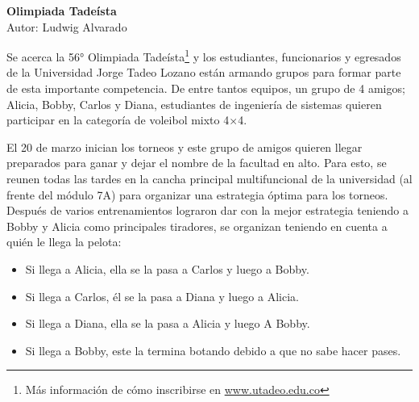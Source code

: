 \documentclass[11pt,a4paper]{article}
\begin{document}
\begin{center}
  {\LARGE \bf Olimpiada Tadeísta}\\[1ex]
  Autor: Ludwig Alvarado
\end{center}


Se acerca la 56° Olimpiada Tadeísta\footnote{Más información de cómo inscribirse en \url{www.utadeo.edu.co}} y los estudiantes, funcionarios y egresados de la Universidad Jorge Tadeo Lozano están armando grupos para formar parte de esta importante competencia. De entre tantos equipos, un grupo de 4 amigos; Alicia, Bobby, Carlos y Diana, estudiantes de ingeniería de sistemas quieren participar en la categoría de voleibol mixto 4\(\times\)4.

El 20 de marzo inician los torneos y este grupo de amigos quieren llegar preparados para ganar y dejar el nombre de la facultad en alto. Para esto, se reunen todas las tardes en la cancha principal multifuncional de la universidad (al frente del módulo 7A) para organizar una estrategia óptima para los torneos. Después de varios entrenamientos lograron dar con la mejor estrategia teniendo a Bobby y Alicia como principales tiradores, se organizan teniendo en cuenta a quién le llega la pelota:

\begin{itemize}
  \item Si llega a Alicia, ella se la pasa a Carlos y luego a Bobby.
  \item Si llega a Carlos, él se la pasa a Diana y luego a Alicia.
  \item Si llega a Diana, ella se la pasa a Alicia y luego A Bobby.
  \item Si llega a Bobby, este la termina botando debido a que no sabe hacer pases.
\end{itemize}
\end{document}
